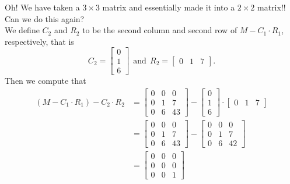 Oh! We have taken a $3 \times 3$ matrix and essentially made it into a $2 \times 2 $ matrix!! Can we do this again? \\

We define $C_2$  and $R_2$  to be the second column and second row of $M- C_1 \cdot R_1$, respectively, that is
$$C_2=\left[\begin{array}{r} 
    0  \\ 1 \\ 6  \end{array}  \right]~~\text{and}~~R_2=\left[\begin{array}{rrr} 
   0   &  1   &  7 \end{array}  \right].  $$
   Then we compute that 
   \begin{align*} 
\left(M - C_1 \cdot R_1 \right)  -  C_2 \cdot R_2 &= \left[\begin{array}{rrr} 
       0  &   0  &   0 \\
     0   &  1   &  7 \\
     0   &  6   & 43 \end{array}  \right] -  \left[\begin{array}{r} 
    0  \\ 1 \\ 6  \end{array}  \right] \cdot \left[\begin{array}{rrr} 
   0   &  1   &  7 \end{array}  \right] \\
     &=\left[\begin{array}{rrr} 
       0  &   0  &   0 \\
     0   &  1   &  7 \\
     0   &  6   & 43 \end{array}  \right] -\left[\begin{array}{rrr} 
       0  &   0  &   0 \\
     0   &  1   &  7 \\
     0   &  6   & 42 \end{array}  \right]\\
     &=\left[\begin{array}{rrr} 
       0  &   0  &   0 \\
     0   &  0   &  0 \\
     0   &  0   & 1 \end{array}  \right]
\end{align*}
     
